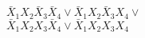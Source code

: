 \documentclass[preview]{standalone}
\begin{document}
\begin{center}
${\bar X_{1} X_{2} \bar X_{3} \bar X_{4} \lor \bar X_{1} X_{2} \bar X_{3} X_{4} \lor}$  \\ ${\bar X_{1} X_{2} X_{3} \bar X_{4} \lor \bar X_{1} X_{2} X_{3} X_{4}}$ \\
\end{center}
\end{document}
